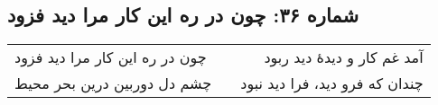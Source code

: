 \begin{center}
\section*{شماره ۳۶: چون در ره این کار مرا دید فزود}
\label{sec:036}
\begin{longtable}{l p{0.5cm} r}
چون در ره این کار مرا دید فزود
&&
آمد غم کار و دیدهٔ دید ربود
\\
چشم دل دوربین درین بحر محیط
&&
چندان که فرو دید، فرا دید نبود
\\
\end{longtable}
\end{center}
